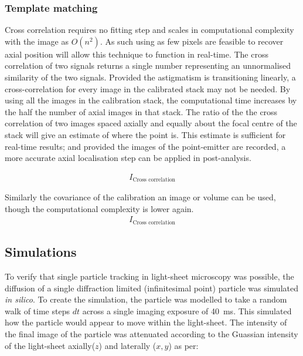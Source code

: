 \subsubsection{Template matching}


Cross correlation requires no fitting step and scales in computational complexity with the image as $O(n^2)$. %
As such using as few pixels are feasible to recover axial position will allow this technique to function in real-time.
The cross correlation of two signals returns a single number representing an unnormalised similarity of the two signals.
Provided the astigmatism is transitioning linearly, a cross-correlation for every image in the calibrated stack may not be needed.
By using all the images in the calibration stack, the computational time increases by the half the number of axial images in that stack.
The ratio of the the cross correlation of two images spaced axially and equally about the focal centre of the stack will give an estimate of where the point is.
This estimate is sufficient for real-time results; and provided the images of the point-emitter are recorded, a more accurate axial localisation step can be applied in post-analysis.

\begin{align}
  I_{\text{Cross correlation}}
\end{align}

Similarly the covariance of the calibration an image or volume can be used, though the computational complexity is lower again.
\begin{align}
  I_{\text{Cross correlation}}
\end{align}

\subsection{Simulations}

To verify that single particle tracking in light-sheet microscopy was possible, the diffusion of a single diffraction limited (infinitesimal point) particle was simulated \emph{in silico}.
To create the simulation, the particle was modelled to take a random walk of time steps $dt$ across a single imaging exposure of \SI{40}{\milli\second}.
This simulated how the particle would appear to move within the light-sheet.
The intensity of the final image of the particle was attenuated according to the Guassian intensity of the light-sheet axially($z$) and laterally ($x,y$) as per:

